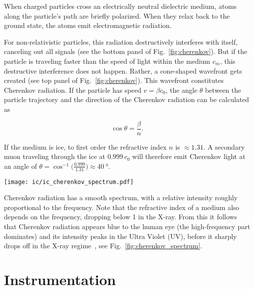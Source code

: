 When charged particles cross an electrically neutral dielectric medium, atoms along the particle's path are briefly polarized. When they relax back to the ground state, the atoms emit electromagnetic radiation.

For non-relativistic particles, this radiation destructively interferes with itself, canceling out all signals (see the bottom panel of Fig.~\ref{fig:cherenkov}). But if the particle is traveling faster than the speed of light within the medium $c_m$, this destructive interference does not happen. Rather, a cone-shaped wavefront gets created (see top panel of Fig.~\ref{fig:cherenkov}). This wavefront constitutes Cherenkov radiation. If the particle has speed $v=\beta c_0$, the angle $\theta$ between the particle trajectory and the direction of the Cherenkov radiation can be calculated as~

\begin{equation}
    \cos{\theta} = \frac{\beta}{n}.
\end{equation}

If the medium is ice, to first order the refractive index $n$ is $\approx1.31$. A secondary muon traveling through the ice at $0.999\,c_0$ will therefore emit Cherenkov light at an angle of $\theta = \cos^{-1}{\big(\frac{0.999}{1.31}\big)} \approx \SI{40}{\degree}$.
\begin{marginfigure}
    \texttt{[image: ic/ic\_cherenkov\_spectrum.pdf]}
    \caption[Cherenkov spectrum]{Cherenkov spectrum for a particle with $v=0.8 \,c_0$ in water. The intensity peaks at $\SI{4e15}{\Hz}$, corresponding to a wavelength of \SI{75}{\nm}, lying at the high-frequency end of the UV spectrum. Adapted from~\cite{Fulop1992}.}
\end{marginfigure}
Cherenkov radiation has a smooth spectrum, with a relative intensity roughly proportional to the frequency. Note that the refractive index of a medium also depends on the frequency, dropping below 1 in the X-ray. From this it follows that Cherenkov radiation appears blue to the human eye (the high-frequency part dominates) and its intensity peaks in the Ultra Violet (UV), before it sharply drops off in the X-ray regime~, see Fig.~\ref{fig:cherenkov_spectrum}.

\section{Instrumentation}

